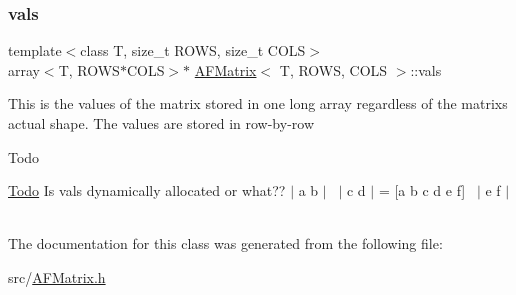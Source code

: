 \mbox{\label{class_a_f_matrix_abca47cc50d551c1e8d79559773729e87}} 
\subsubsection{\texorpdfstring{vals}{vals}}
{\footnotesize\ttfamily template$<$class T, size\+\_\+t R\+O\+WS, size\+\_\+t C\+O\+LS$>$ \\
array$<$T, R\+O\+WS$\ast$C\+O\+LS$>$$\ast$ \hyperlink{class_a_f_matrix}{A\+F\+Matrix}$<$ T, R\+O\+WS, C\+O\+LS $>$\+::vals}

This is the values of the matrix stored in one long array regardless of the matrix\textquotesingle{}s actual shape. The values are stored in row-\/by-\/row

\begin{DoxyRefDesc}{Todo}
\item[\hyperlink{todo__todo000001}{Todo}]Is vals dynamically allocated or what?? $\vert$ a b $\vert$~\newline
$\vert$ c d $\vert$ = \mbox{[}a b c d e f\mbox{]}~\newline
$\vert$ e f $\vert$~\newline
\end{DoxyRefDesc}


The documentation for this class was generated from the following file\+:\begin{DoxyCompactItemize}
\item 
src/\hyperlink{_a_f_matrix_8h}{A\+F\+Matrix.\+h}\end{DoxyCompactItemize}
